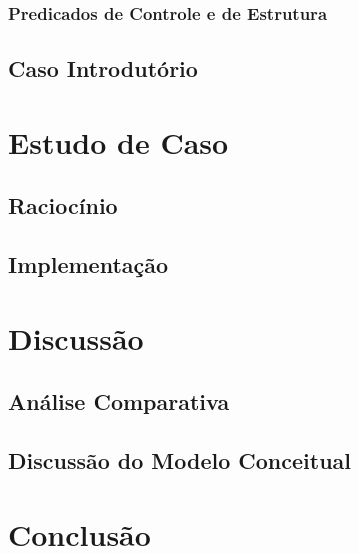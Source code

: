 \documentclass[openright]{normas-utf-tex} %
\begin{document}
		\subsection{Predicados de Controle e de Estrutura} \label{cenarios}
			
	\section{Caso Introdutório} \label{introdutorycase}
			

\chapter{Estudo de Caso} \label{casestudy}
\label{studycase}
	
	\section{Raciocínio} \label{rac}
		
	\section{Implementação} \label{validation}
		
\chapter{Discussão}
\label{chap:disc}
	
	\section{Análise Comparativa}\label{analisecomparativa}
		
			
		
		
		
	\section{Discussão do Modelo Conceitual}\label{constresult}
		
\label{chap:anacomp}
\chapter{Conclusão}
\label{chap:conc}
	
\end{document}
